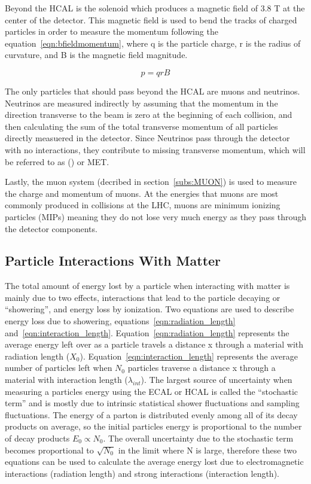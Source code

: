 Beyond the HCAL is the solenoid which produces a magnetic field of 3.8 T at the center of the detector.
This magnetic field is used to bend the tracks of charged particles in order to measure the momentum following the equation~\ref{eqn:bfieldmomentum},
where q is the particle charge, r is the radius of curvature, and B is the magnetic field magnitude.

\begin{equation}
  \label{eqn:bfieldmomentum}
p = qrB
\end{equation}

The only particles that should pass beyond the HCAL are muons and neutrinos.
Neutrinos are measured indirectly by assuming that the momentum in the direction transverse to the beam is zero at the beginning of each collision,
and then calculating the sum of the total transverse momentum of all particles directly measuered in the detector.
Since Neutrinos pass through the detector with no interactions, they contribute to missing transverse momentum, which will be referred to as (\MET) or MET.

Lastly, the muon system (decribed in section~\ref{subs:MUON}) is used to measure the charge and momentum of muons.
At the energies that muons are most commonly produced in collisions at the LHC, muons are minimum ionizing particles (MIPs)
meaning they do not lose very much energy as they pass through the detector components.

\subsection{Particle Interactions With Matter}

The total amount of energy lost by a particle when interacting with matter is mainly due to two effects,
interactions that lead to the particle decaying or ``showering'',
and energy loss by ionization.
Two equations are used to describe energy loss due to showering, equations~\ref{eqn:radiation_length} and~\ref{eqn:interaction_length}.
Equation~\ref{eqn:radiation_length} represents the average energy left over as a particle travels a distance x through a material with radiation length ($X_{0}$).
Equation~\ref{eqn:interaction_length} represents the average number of particles left when $N_{0}$ particles traverse a distance x through a material with interaction length ($\lambda_{int}$).
The largest source of uncertainty when measuring a particles energy using the ECAL or HCAL is called the ``stochastic term''
and is mostly due to intrinsic statistical shower fluctuations and sampling fluctuations.
The energy of a parton is distributed evenly among all of its decay products on average,
so the initial particles energy is proportional to the number of decay products $E_{0} \propto N_{0}$.
The overall uncertainty due to the stochastic term becomes proportional to $\sqrt{N_{0}}$ in the limit where N is large,
therefore these two equations can be used to calculate the average energy lost due to
electromagnetic interactions (radiation length) and strong interactions (interaction length).

